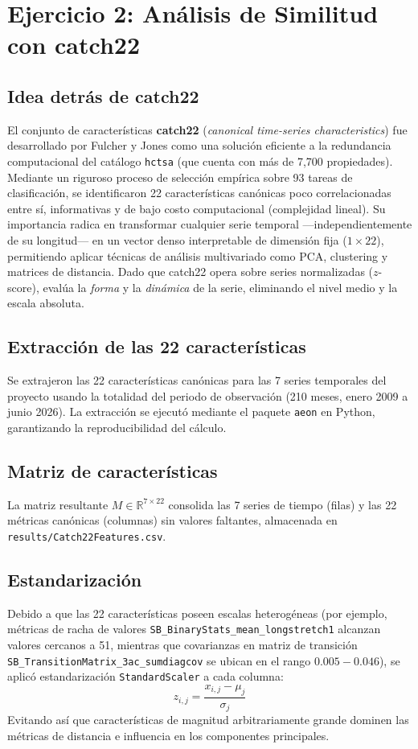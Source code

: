 \documentclass[11pt, a4paper]{article}
\begin{document}
\newpage

\section{Ejercicio 2: Análisis de Similitud con catch22}

\subsection{Idea detrás de catch22}
El conjunto de características \textbf{catch22} (\textit{canonical time-series characteristics}) fue desarrollado por Fulcher y Jones como una solución eficiente a la redundancia computacional del catálogo \texttt{hctsa} (que cuenta con más de 7,700 propiedades). Mediante un riguroso proceso de selección empírica sobre 93 tareas de clasificación, se identificaron 22 características canónicas poco correlacionadas entre sí, informativas y de bajo costo computacional (complejidad lineal). Su importancia radica en transformar cualquier serie temporal ---independientemente de su longitud--- en un vector denso interpretable de dimensión fija ($1 \times 22$), permitiendo aplicar técnicas de análisis multivariado como PCA, clustering y matrices de distancia. Dado que catch22 opera sobre series normalizadas ($z$-score), evalúa la \emph{forma} y la \emph{dinámica} de la serie, eliminando el nivel medio y la escala absoluta.

\subsection{Extracción de las 22 características}
Se extrajeron las 22 características canónicas para las 7 series temporales del proyecto usando la totalidad del periodo de observación (210 meses, enero 2009 a junio 2026). La extracción se ejecutó mediante el paquete \texttt{aeon} en Python, garantizando la reproducibilidad del cálculo.

\subsection{Matriz de características}
La matriz resultante $M \in \mathbb{R}^{7 \times 22}$ consolida las 7 series de tiempo (filas) y las 22 métricas canónicas (columnas) sin valores faltantes, almacenada en \texttt{results/Catch22Features.csv}.

\subsection{Estandarización}
Debido a que las 22 características poseen escalas heterogéneas (por ejemplo, métricas de racha de valores \texttt{SB\_BinaryStats\_mean\_longstretch1} alcanzan valores cercanos a 51, mientras que covarianzas en matriz de transición \texttt{SB\_TransitionMatrix\_3ac\_sumdiagcov} se ubican en el rango $0.005 - 0.046$), se aplicó estandarización \texttt{StandardScaler} a cada columna:
\begin{equation}
z_{i,j} = \frac{x_{i,j} - \mu_j}{\sigma_j}
\end{equation}
Evitando así que características de magnitud arbitrariamente grande dominen las métricas de distancia e influencia en los componentes principales.
\end{document}
